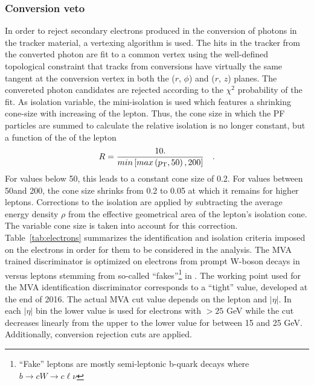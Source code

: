 \subsubsection*{Conversion veto}
\noindent\justify  
In order to reject secondary electrons produced in the conversion of photons in the tracker material, a vertexing algorithm is used. 
The hits in the tracker from the converted photon are fit to a common vertex using the well-defined topological constraint that tracks from conversions have virtually the same tangent at the conversion vertex in both the ($r$, $\phi$) and ($r$, $z$) planes. 
The convereted photon candidates are rejected according to the $\chi^{2}$ probability of the fit.
As isolation variable, the mini-isolation is used which features a shrinking cone-size with increasing \pt of the lepton. 
Thus, the cone size in which the PF particles are summed to calculate the relative isolation is no longer constant, but a function of the \pt of the lepton
\begin{equation*}
    R = \frac{10.}{min\left[ max \left( p_{\mathrm{T}}, 50 \right), 200 \right]} \quad.
\end{equation*}
For \pt values below 50\GeV, this leads to a constant cone size of 0.2. 
For \pt values between 50\GeV and 200\GeV, the cone size shrinks from 0.2 to 0.05 at which it remains for higher \pt leptons.
Corrections to the isolation are applied by subtracting the average energy density $\rho$ from the effective geometrical area of the lepton's isolation cone. 
The variable cone size is taken into account for this correction.
Table~\ref{tab:electrons} summarizes the identification and isolation criteria imposed on the electrons in order for them to be considered in the analysis. 
The MVA trained discriminator is optimized on electrons from prompt W-boson decays in \ttbar versus leptons stemming from so-called ``fakes''\footnote{``Fake'' leptons are mostly semi-leptonic b-quark decays where $b \rightarrow cW \rightarrow c\ell \nu$} in \ttbar. 
The working point used for the MVA identification discriminator corresponds to a ``tight'' value, developed at the end of 2016. 
The actual MVA cut value depends on the lepton \pt and $|\eta|$. 
In each $|\eta|$ bin the lower value is used for electrons with \pt $> 25$ GeV while the cut decreases linearly from the upper to the lower value for \pt between 15 and 25 GeV. 
Additionally, conversion rejection cuts are applied.                        
